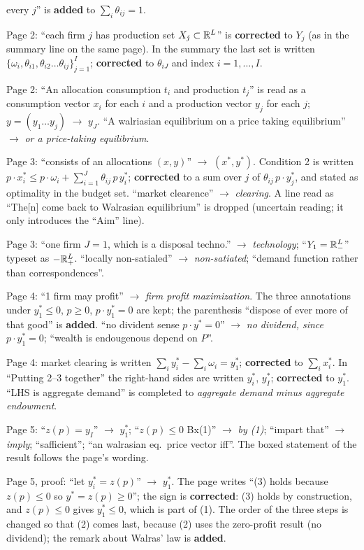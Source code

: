 \documentclass[11pt]{article}
\begin{document}
\begin{transcriptnotes}
        every $j$'' is \textbf{added} to $\sum_i\theta_{ij}=1$.
  \item Page 2: ``each firm $j$ has production set $X_j\subset\mathbb{R}^L$'' is \textbf{corrected}
        to $Y_j$ (as in the summary line on the same page). In the summary the last set is
        written $\{\omega_i,\theta_{i1},\theta_{i2}\dots\theta_{ij}\}_{j=1}^{I}$;
        \textbf{corrected} to $\theta_{iJ}$ and index $i=1,\dots,I$.
  \item Page 2: ``An allocation consumption $t_i$ and production $t_j$'' is read as a
        consumption vector $x_i$ for each $i$ and a production vector $y_j$ for each $j$;
        $y=(y_1\dots y_j)$ $\to$ $y_J$. ``A walriasian equilibrium on a price taking
        equilibrium'' $\to$ \emph{or a price-taking equilibrium}.
  \item Page 3: ``consists of an allocations $(x,y)$'' $\to$ $(x^*,y^*)$. Condition 2 is
        written $p\cdot x_i^*\le p\cdot\omega_i+\sum_{i=1}^{J}\theta_{ij}\,p\,y_i^*$;
        \textbf{corrected} to a sum over $j$ of $\theta_{ij}\,p\cdot y_j^*$, and stated as
        optimality in the budget set. ``market clearence'' $\to$ \emph{clearing}. A line
        read as ``The[n] come back to Walrasian equilibrium'' is dropped (uncertain reading;
        it only introduces the ``Aim'' line).
  \item Page 3: ``one firm $J=1$, which is a disposal techno.'' $\to$ \emph{technology};
        ``$Y_1=\mathbb{R}^L_-$'' typeset as $-\mathbb{R}^L_+$. ``locally non-satialed'' $\to$
        \emph{non-satiated}; ``demand function rather than correspondences''.
  \item Page 4: ``1 firm may profit'' $\to$ \emph{firm profit maximization}. The three
        annotations under $y_1^*\le0$, $p\ge0$, $p\cdot y_1^*=0$ are kept; the parenthesis
        ``dispose of ever more of that good'' is \textbf{added}. ``no divident sense
        $p\cdot y^*=0$'' $\to$ \emph{no dividend, since} $p\cdot y_1^*=0$; ``wealth is
        endougenous depend on $P$''.
  \item Page 4: market clearing is written $\sum_i y_i^*-\sum_i\omega_i=y_1^*$;
        \textbf{corrected} to $\sum_i x_i^*$. In ``Putting 2--3 together'' the right-hand
        sides are written $y_i^*$, $y_I^*$; \textbf{corrected} to $y_1^*$. ``LHS is
        aggregate demand'' is completed to \emph{aggregate demand minus aggregate
        endowment}.
  \item Page 5: ``$z(p)=y_I$'' $\to$ $y_1^*$; ``$z(p)\le0$ Bx(1)'' $\to$ \emph{by (1)};
        ``impart that'' $\to$ \emph{imply}; ``safficient''; ``an walrasian eq.\ price
        vector iff''. The boxed statement of the result follows the page's wording.
  \item Page 5, proof: ``let $y_i^*=z(p)$'' $\to$ $y_1^*$. The page writes ``(3) holds
        because $z(p)\le0$ so $y^*=z(p)\ge0$''; the sign is \textbf{corrected}: (3) holds by
        construction, and $z(p)\le0$ gives $y_1^*\le0$, which is part of (1). The order of
        the three steps is changed so that (2) comes last, because (2) uses the zero-profit
        result (no dividend); the remark about Walras' law is \textbf{added}.
\end{transcriptnotes}
\end{document}
